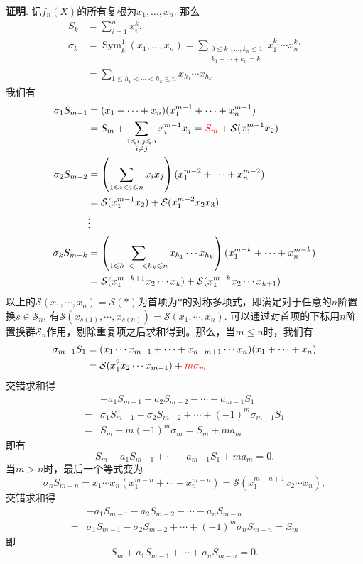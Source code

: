 {{\bf 证明}. 记$f_n(X)$的所有复根为$x_1,\ldots,x_n$. 那么
\begin{align*}
S_k & = \sum\limits_{i=1}^n x_i^k, \\
\sigma_k & = \operatorname{Sym}_k^1(x_1,\ldots,x_n) = \sum\limits_{\substack{0 \leqslant k_1,\ldots,k_n \leqslant 1 \\ k_1+\cdots+k_n=k}} x_1^{k_1} \cdots x_n^{k_n} \\
& = \sum\limits_{1 \leqslant h_1 < \cdots < h_k \leqslant n} x_{h_1} \cdots x_{h_k}
\end{align*}
我们有
\begin{align*}
\sigma_1 S_{m-1} & = (x_1 + \cdots + x_n) (x_1^{m-1} + \cdots + x_n^{m-1}) \\
& = S_m + \sum_{\substack{1 \leqslant i,j \leqslant n \\ i\neq j}} x_i^{m-1} x_j = {\color{red} S_m} + \mathcal{S}(x_1^{m-1}x_2) \\
\sigma_2 S_{m-2} & = \left( \sum_{1 \leqslant i < j \leqslant n } x_i x_j \right) (x_1^{m-2} + \cdots + x_n^{m-2}) \\
& = \mathcal{S}(x_1^{m-1}x_2) + \mathcal{S}(x_1^{m-2}x_2x_3) \\
& \vdots \\
\sigma_k S_{m-k} & = \left( \sum\limits_{1 \leqslant h_1 < \cdots < h_k \leqslant n} x_{h_1} \cdots x_{h_k} \right) (x_1^{m-k} + \cdots + x_n^{m-k}) \\
& = \mathcal{S}(x_1^{m-k+1}x_2\cdots x_k) + \mathcal{S}(x_1^{m-k}x_2\cdots x_{k+1})
\end{align*}
以上的$\mathcal{S}(x_1,\cdots,x_n) = \mathcal{S}(\ast)$为首项为$\ast$的对称多项式，即满足对于任意的$n$阶置换$s\in \mathcal{S}_n$, 有$\mathcal{S}(x_{s(1)},\cdots,x_{s(n)}) = \mathcal{S}(x_1,\cdots,x_n)$. 可以通过对首项的下标用$n$阶置换群$\mathcal{S}_n$作用，剔除重复项之后求和得到。那么，当$m\leqslant n$时，我们有
\begin{align*}
\sigma_{m-1} S_1 & = (x_1\cdots x_{m-1} + \cdots + x_{n-m+1}\cdots x_{n}) (x_1 + \cdots + x_{n}) \\
& = \mathcal{S}(x_1^2x_2\cdots x_{m-1}) + {\color{red} m\sigma_m}
\end{align*}
交错求和得
\begin{align*}
& -a_1 S_{m-1} - a_2 S_{m-2} - \cdots - a_{m-1} S_1 \\
= & \sigma_1 S_{m-1} - \sigma_2 S_{m-2} + \cdots + (-1)^{m} \sigma_{m-1} S_{1} \\
= & S_m + m(-1)^{m}\sigma_m = S_m + ma_m
\end{align*}
即有
$$S_m + a_1S_{m-1} + \cdots + a_{m-1}S_1 + ma_m = 0.$$
当$m > n$时，最后一个等式变为
$$\sigma_n S_{m-n} = x_1\cdots x_n (x_1^{m-n} + \cdots + x_n^{m-n}) = \mathcal{S}(x_1^{m-n+1}x_2 \cdots x_n),$$
交错求和得
\begin{align*}
& -a_1 S_{m-1} - a_2 S_{m-2} - \cdots - a_n S_{m-n} \\
= & \sigma_1 S_{m-1} - \sigma_2 S_{m-2} + \cdots + (-1)^{m} \sigma_n S_{m-n} = S_m
\end{align*}
即
$$S_m + a_1 S_{m-1} + \cdots + a_n S_{m-n} = 0.$$

}
